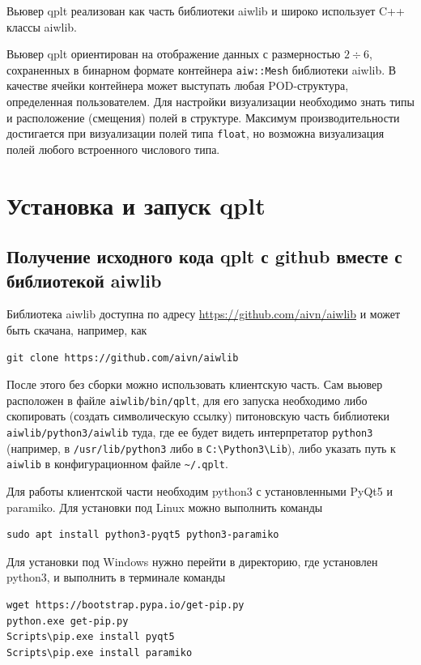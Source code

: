 \documentclass[12pt]{article}
\begin{document}
Вьювер qplt реализован как часть библиотеки aiwlib и широко использует C++ классы aiwlib.

Вьювер qplt ориентирован на отображение данных с размерностью $2\div6$, сохраненных в бинарном формате контейнера \verb'aiw::Mesh' библиотеки aiwlib.
В качестве ячейки контейнера может выступать любая POD-структура, определенная пользователем.
Для настройки визуализации необходимо знать типы и расположение (смещения) полей в структуре.
Максимум производительности достигается при визуализации полей типа \verb'float', но возможна визуализация полей
любого встроенного числового типа.

\section{Установка и запуск qplt}
\subsection{Получение исходного кода qplt с github вместе с библиотекой aiwlib}
Библиотека aiwlib доступна по адресу \href{https://github.com/aivn/aiwlib}{https://github.com/aivn/aiwlib}
и может быть скачана, например, как
\begin{verbatim}
git clone https://github.com/aivn/aiwlib
\end{verbatim}
После этого без сборки можно использовать клиентскую часть. Сам вьювер расположен в файле \verb'aiwlib/bin/qplt',
для его запуска необходимо либо скопировать (создать символическую ссылку) питоновскую часть библиотеки \verb'aiwlib/python3/aiwlib'
туда, где ее будет видеть интерпретатор \verb'python3' (например, в \verb'/usr/lib/python3' либо в \verb'C:\Python3\Lib'),
либо указать путь к \verb'aiwlib' в конфигурационном файле \verb'~/.qplt'.

Для работы клиентской части необходим python3 с установленными PyQt5 и paramiko. Для установки под Linux можно выполнить команды
\begin{verbatim}
sudo apt install python3-pyqt5 python3-paramiko
\end{verbatim}
Для установки под Windows нужно перейти в директорию, где установлен python3, и выполнить в терминале команды
\begin{verbatim}
wget https://bootstrap.pypa.io/get-pip.py 
python.exe get-pip.py
Scripts\pip.exe install pyqt5
Scripts\pip.exe install paramiko
\end{verbatim}
\end{document}

